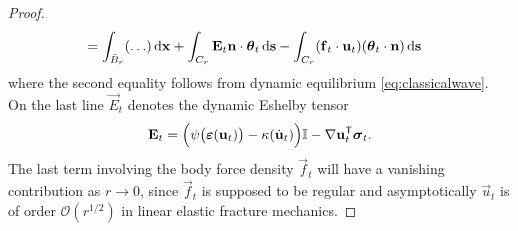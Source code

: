 \begin{proof}
\begin{align*}
&= \int_{\tilde{B}_r}(\ldots)\dx+\int_{C_r}\vec{E}_t\vec{n}\cdot\vtheta_t\ds-\int_{C_r}(\vec{f}_t\cdot\vec{u}_t)(\vtheta_t\cdot\vec{n})\ds
\end{align*}
where the second equality follows from dynamic equilibrium \eqref{eq:classicalwave}. On the last line $\vec{E}_t$ denotes the dynamic Eshelby tensor \cite{Maugin:1994}
\begin{equation} \label{eq:Eshelby}
\vec{E}_t=\Bigl(\psi\bigl(\eps(\vec{u}_t)\bigr)-\kappa(\dot{\vec{u}}_t)\Bigr)\mathbb{I}-\nabla\vec{u}_t^\mT\sig_t.
\end{equation}
The last term involving the body force density $\vec{f}_t$ will have a vanishing contribution as $r\to 0$, since $\vec{f}_t$ is supposed to be regular and asymptotically $\vec{u}_t$ is of order $\mathcal{O}(r^{1/2})$ in linear elastic fracture mechanics.


\end{proof}
